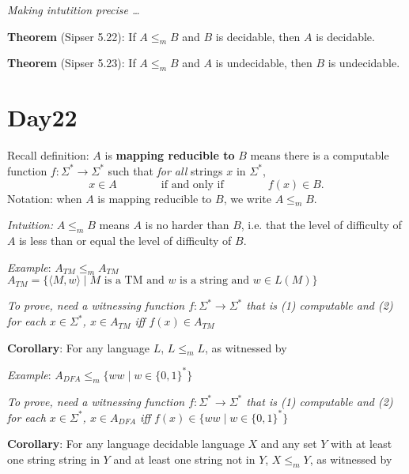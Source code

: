 \documentclass[12pt, oneside]{article}
\begin{document}
{\it Making intutition precise \ldots}

{\bf Theorem} (Sipser 5.22): If $A \leq_m B$ and $B$ is decidable, then $A$ is decidable.
    
\vfill
\vfill


{\bf Theorem} (Sipser 5.23): If $A \leq_m B$ and $A$ is undecidable, then $B$ is undecidable.
    
\vfill
 \vfill
\section*{Day22}



Recall definition:  $A$ is  {\bf  mapping  reducible to} $B$  means there is a computable function 
$f : \Sigma^* \to \Sigma^*$ such that {\it for all} strings  $x$ in $\Sigma^*$, 
\[
x  \in  A \qquad \qquad \text{if and  only  if} \qquad \qquad f(x) \in B.
\]
Notation:  when $A$  is mapping reducible to $B$, we write $A  \leq_m B$.

{\it Intuition:} $A \leq_m B$ means $A$ is no harder than $B$, i.e. that the level 
of difficulty of $A$ is less than or equal the level of difficulty of $B$.


{\it Example}: $A_{TM} \leq_m A_{TM}$  \hfill 
$A_{TM} = \{ \langle M, w \rangle  \mid M \text{ is a TM and } w \text{ is a string and } w \in L(M) \}$

{\it To prove, need a witnessing function $f: \Sigma^* \to \Sigma^*$ that is (1) computable and 
(2) for each $x \in \Sigma^*$, $x \in A_{TM}$ iff $f(x) \in A_{TM}$}


\vfill


{\bf Corollary}: For any language $L$, $L \leq_m L$, as witnessed by 

\newpage

{\it Example}: $A_{DFA} \leq_m \{ ww \mid  w \in \{0,1\}^* \}$ 


{\it To prove, need a witnessing function $f: \Sigma^* \to \Sigma^*$ that is (1) computable and 
(2) for each $x \in \Sigma^*$, $x \in A_{DFA}$ iff $f(x) \in \{ ww \mid  w \in \{0,1\}^* \}$}


\vfill

{\bf Corollary}: For any language decidable language $X$ and any 
set $Y$ with at least one string string in $Y$ and at least one string not in $Y$, $X \leq_m Y$, as witnessed by 

\vfill
\end{document}
